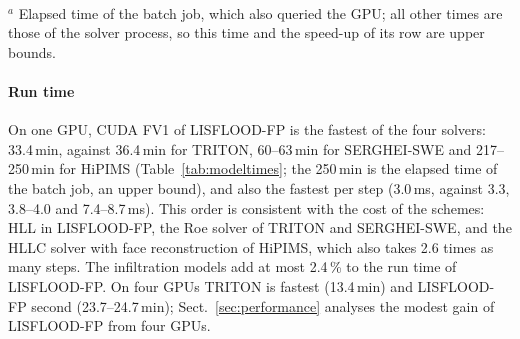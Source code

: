 \documentclass[preprint,12pt,authoryear]{elsarticle}
\begin{document}
\begin{table}[t]
\caption{Wall-clock time of the 96\,h Alzette simulation in double
precision on NVIDIA A100-SXM4-40GB GPUs of one node, one MPI rank per GPU,
from the start to the end of the solver process; number of time steps.}
\label{tab:modeltimes}
\centering\small
{}
\\[2pt]{\footnotesize $^{a}$ Elapsed time of the batch job, which also
queried the GPU; all other times are those of the solver process, so this
time and the speed-up of its row are upper bounds.}
\end{table}

\paragraph{Run time} On one GPU, CUDA FV1 of LISFLOOD-FP is the fastest of
the four solvers: 33.4\,min, against 36.4\,min for TRITON, 60--63\,min for SERGHEI-SWE
and 217--250\,min for HiPIMS (Table~\ref{tab:modeltimes}; the 250\,min is
the elapsed time of the batch job, an upper bound), and also the
fastest per step (3.0\,ms, against 3.3, 3.8--4.0 and 7.4--8.7\,ms). This
order is consistent with the cost of the schemes: HLL in LISFLOOD-FP, the
Roe solver of TRITON and SERGHEI-SWE, and the HLLC solver with face
reconstruction of HiPIMS, which also takes 2.6 times as many steps. The
infiltration models add at most 2.4\,\% to the run time of LISFLOOD-FP. On four GPUs TRITON is fastest
(13.4\,min) and LISFLOOD-FP second (23.7--24.7\,min); Sect.~\ref{sec:performance}
analyses the modest gain of LISFLOOD-FP from four GPUs.
\end{document}
